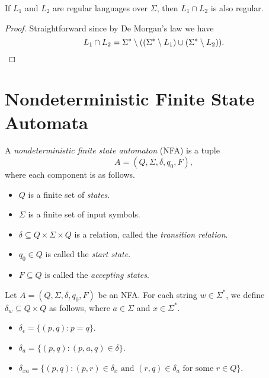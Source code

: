 \begin{corollary}
  If $L_1$ and $L_2$ are regular languages over $\Sigma$, then $L_1 \cap L_2$
  is also regular.
\end{corollary}
\begin{proof}
  Straightforward since by De Morgan's law we have
  \begin{equation*}
    L_1 \cap L_2
    = \Sigma^* \setminus
    ((\Sigma^* \setminus L_1) \cup (\Sigma^* \setminus L_2)).
    \qedhere
  \end{equation*}
\end{proof}

\section{Nondeterministic Finite State Automata}
\begin{definition}
  \label{def:nfa}
  A \emph{nondeterministic finite state automaton} (NFA) is a tuple
  \begin{equation*}
    A = (Q, \Sigma, \delta, q_0, F),
  \end{equation*}
  where each component is as follows.
  \begin{itemize}
    \item $Q$ is a finite set of \emph{states}.
    \item $\Sigma$ is a finite set of input symbols.
    \item $\delta \subseteq Q \times \Sigma \times Q$ is a relation, called the
    \emph{transition relation}.
    \item $q_0 \in Q$ is called the \emph{start state}.
    \item $F \subseteq Q$ is called the \emph{accepting states}.
  \end{itemize}
\end{definition}

\begin{definition}
  Let $A = (Q, \Sigma, \delta, q_0, F)$ be an NFA.
  For each string $w \in \Sigma^*$, we define $\delta_w \subseteq Q \times Q$
  as follows, where $a \in \Sigma$ and $x \in \Sigma^*$.
  \begin{itemize}
    \item $\delta_\epsilon = \{(p, q): p = q\}$.
    \item $\delta_a = \{(p, q): (p, a, q) \in \delta\}$.
    \item $\delta_{xa} = \{(p, q): \text{$(p, r) \in \delta_x$ and
    $(r, q) \in \delta_a$ for some $r \in Q$}\}$.
  \end{itemize}
\end{definition}

